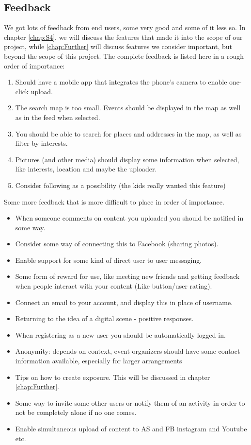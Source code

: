 \subsection{Feedback}
\label{subsec:S2PresentationFeedback}

We got lots of feedback from end users, some very good and some of it less so.  In chapter \ref{chap:S4}, we will discuss the features that made it into the scope of our project, while \ref{chap:Further} will discuss features we consider important, but beyond the scope of this project. The complete feedback is listed here in a rough order of importance:

\begin{enumerate}
  \item Should have a mobile app that integrates the phone’s camera to enable one-click upload.
  \item The search map is too small. Events should be displayed in the map as well as in the feed when selected.
  \item You should be able to search for places and addresses in the map, as well as filter by interests.
  \item Pictures (and other media) should display some information when selected, like interests, location and maybe the uploader.
  \item Consider following as a possibility (the kids really wanted this feature) 
\end{enumerate}

Some more feedback that is more difficult to place in order of importance.

\begin{itemize}
  \item When someone comments on content you uploaded you should be notified in some way.
  \item Consider some way of connecting this to Facebook (sharing photos).
  \item Enable support for some kind of direct user to user messaging.
  \item Some form of reward for use, like meeting new friends and getting feedback when people interact with your content (Like button/user rating).
  \item Connect an email to your account, and display this in place of username.
  \item Returning to the idea of a digital scene - positive responses.
  \item When registering as a new user you should be automatically logged in.
  \item Anonymity: depends on context, event organizers should have some contact information available, especially for larger arrangements
  \item Tips on how to create exposure. This will be discussed in chapter \ref{chap:Further}.
  \item Some way to invite some other users or notify them of an activity in order to not be completely alone if no one comes.
  \item Enable simultaneous upload of content to AS and FB instagram and Youtube etc.
\end{itemize}


